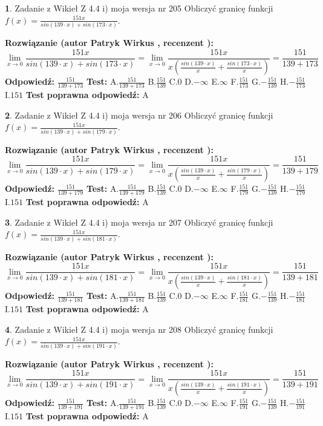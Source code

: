 \documentclass[12pt, a4paper]{article}
\theoremstyle{definition} %
\newtheorem{zad}{}
\newcommand{\zadStart}[1]{\begin{zad}#1\newline}
\newcommand{\zadStop}{\end{zad}}
\newcommand{\rozwStart}[2]{\noindent \textbf{Rozwiązanie (autor #1 , recenzent #2): }\newline}
\newcommand{\rozwStop}{\newline}
\newcommand{\odpStart}{\noindent \textbf{Odpowiedź:}\newline}
\newcommand{\odpStop}{\newline}
\newcommand{\testStart}{\noindent \textbf{Test:}\newline}
\newcommand{\testStop}{\newline}
\newcommand{\kluczStart}{\noindent \textbf{Test poprawna odpowiedź:}\newline}
\newcommand{\kluczStop}{\newline}
\begin{document}
\zadStart{Zadanie z Wikieł Z 4.4 i) moja wersja nr 205}
Obliczyć granicę funkcji $f(x)=\frac{151x}{sin(139\cdot x) +sin(173\cdot x)}$.
\zadStop
\rozwStart{Patryk Wirkus}{}
$$\lim\limits_{x\to 0}\frac{151x}{sin(139\cdot x) +sin(173\cdot x)}=\lim\limits_{x\to 0}\frac{151x}{x(\frac{sin(139\cdot x)}{x}+\frac{sin(173\cdot x)}{x})}=\frac{151}{139+173}$$
\rozwStop
\odpStart
$\frac{151}{139+173}$
\odpStop
\testStart
A.$\frac{151}{139+173}$
B.$\frac{151}{139}$
C.$0$
D.$-\infty$
E.$\infty$
F.$\frac{151}{173}$
G.$-\frac{151}{139}$
H.$-\frac{151}{173}$
I.$151$
\testStop
\kluczStart
A
\kluczStop



\zadStart{Zadanie z Wikieł Z 4.4 i) moja wersja nr 206}
Obliczyć granicę funkcji $f(x)=\frac{151x}{sin(139\cdot x) +sin(179\cdot x)}$.
\zadStop
\rozwStart{Patryk Wirkus}{}
$$\lim\limits_{x\to 0}\frac{151x}{sin(139\cdot x) +sin(179\cdot x)}=\lim\limits_{x\to 0}\frac{151x}{x(\frac{sin(139\cdot x)}{x}+\frac{sin(179\cdot x)}{x})}=\frac{151}{139+179}$$
\rozwStop
\odpStart
$\frac{151}{139+179}$
\odpStop
\testStart
A.$\frac{151}{139+179}$
B.$\frac{151}{139}$
C.$0$
D.$-\infty$
E.$\infty$
F.$\frac{151}{179}$
G.$-\frac{151}{139}$
H.$-\frac{151}{179}$
I.$151$
\testStop
\kluczStart
A
\kluczStop



\zadStart{Zadanie z Wikieł Z 4.4 i) moja wersja nr 207}
Obliczyć granicę funkcji $f(x)=\frac{151x}{sin(139\cdot x) +sin(181\cdot x)}$.
\zadStop
\rozwStart{Patryk Wirkus}{}
$$\lim\limits_{x\to 0}\frac{151x}{sin(139\cdot x) +sin(181\cdot x)}=\lim\limits_{x\to 0}\frac{151x}{x(\frac{sin(139\cdot x)}{x}+\frac{sin(181\cdot x)}{x})}=\frac{151}{139+181}$$
\rozwStop
\odpStart
$\frac{151}{139+181}$
\odpStop
\testStart
A.$\frac{151}{139+181}$
B.$\frac{151}{139}$
C.$0$
D.$-\infty$
E.$\infty$
F.$\frac{151}{181}$
G.$-\frac{151}{139}$
H.$-\frac{151}{181}$
I.$151$
\testStop
\kluczStart
A
\kluczStop



\zadStart{Zadanie z Wikieł Z 4.4 i) moja wersja nr 208}
Obliczyć granicę funkcji $f(x)=\frac{151x}{sin(139\cdot x) +sin(191\cdot x)}$.
\zadStop
\rozwStart{Patryk Wirkus}{}
$$\lim\limits_{x\to 0}\frac{151x}{sin(139\cdot x) +sin(191\cdot x)}=\lim\limits_{x\to 0}\frac{151x}{x(\frac{sin(139\cdot x)}{x}+\frac{sin(191\cdot x)}{x})}=\frac{151}{139+191}$$
\rozwStop
\odpStart
$\frac{151}{139+191}$
\odpStop
\testStart
A.$\frac{151}{139+191}$
B.$\frac{151}{139}$
C.$0$
D.$-\infty$
E.$\infty$
F.$\frac{151}{191}$
G.$-\frac{151}{139}$
H.$-\frac{151}{191}$
I.$151$
\testStop
\kluczStart
A
\kluczStop
\end{document}
